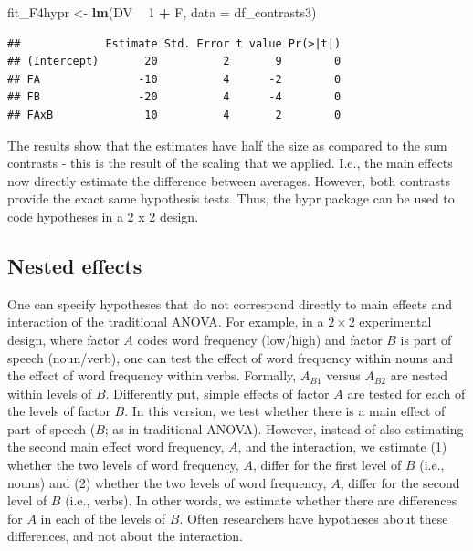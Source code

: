 \documentclass[12pt,]{krantz}
\newenvironment{Shaded}{\begin{snugshade}}{\end{snugshade}}
\newcommand{\DataTypeTok}[1]{\textcolor[rgb]{0.13,0.29,0.53}{#1}}
\newcommand{\DecValTok}[1]{\textcolor[rgb]{0.00,0.00,0.81}{#1}}
\newcommand{\KeywordTok}[1]{\textcolor[rgb]{0.13,0.29,0.53}{\textbf{#1}}}
\newcommand{\NormalTok}[1]{#1}
\newcommand{\OperatorTok}[1]{\textcolor[rgb]{0.81,0.36,0.00}{\textbf{#1}}}
\newcommand{\StringTok}[1]{\textcolor[rgb]{0.31,0.60,0.02}{#1}}
\begin{document}
\begin{Shaded}
\begin{Highlighting}[]
\NormalTok{fit_F4hypr <-}\StringTok{ }\KeywordTok{lm}\NormalTok{(DV }\OperatorTok{~}\StringTok{ }\DecValTok{1} \OperatorTok{+}\StringTok{ }\NormalTok{F,}
                 \DataTypeTok{data =}\NormalTok{ df_contrasts3)}
\end{Highlighting}
\end{Shaded}

\begin{Shaded}
\end{Shaded}

\begin{verbatim}
##             Estimate Std. Error t value Pr(>|t|)
## (Intercept)       20          2       9        0
## FA               -10          4      -2        0
## FB               -20          4      -4        0
## FAxB              10          4       2        0
\end{verbatim}

The results show that the estimates have half the size as compared to the sum contrasts - this is the result of the scaling that we applied. I.e., the main effects now directly estimate the difference between averages. However, both contrasts provide the exact same hypothesis tests. Thus, the hypr package can be used to code hypotheses in a 2 x 2 design.

\hypertarget{nestedEffects}{%
\subsection{Nested effects}\label{nestedEffects}}

One can specify hypotheses that do not correspond directly to main effects and interaction of the traditional ANOVA. For example, in a \(2 \times 2\) experimental design, where factor \(A\) codes word frequency (low/high) and factor \(B\) is part of speech (noun/verb), one can test the effect of word frequency within nouns and the effect of word frequency within verbs. Formally, \(A_{B1}\) versus \(A_{B2}\) are nested within levels of \(B\). Differently put, simple effects of factor \(A\) are tested for each of the levels of factor \(B\).
In this version, we test whether there is a main effect of part of speech (\(B\); as in traditional ANOVA). However, instead of also estimating the second main effect word frequency, \(A\), and the interaction, we estimate (1) whether the two levels of word frequency, \(A\), differ for the first level of \(B\) (i.e., nouns) and (2) whether the two levels of word frequency, \(A\), differ for the second level of \(B\) (i.e., verbs). In other words, we estimate whether there are differences for \(A\) in each of the levels of \(B\). Often researchers have hypotheses about these differences, and not about the interaction.
\end{document}
